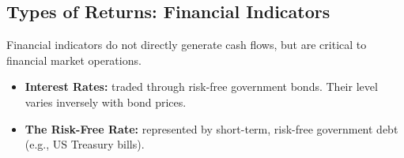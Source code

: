 \subsection{Types of Returns: Financial Indicators}
	\label{subsec:Types of Returns: Financial Indicators}
Financial indicators do not directly generate cash flows, but are critical to financial market operations. 
\begin{itemize}
	\item \textbf{Interest Rates:} traded through risk-free government bonds. Their level varies inversely with bond prices.
	\item \textbf{The Risk-Free Rate:} represented by short-term, risk-free government debt (e.g., US Treasury bills).
\end{itemize}





